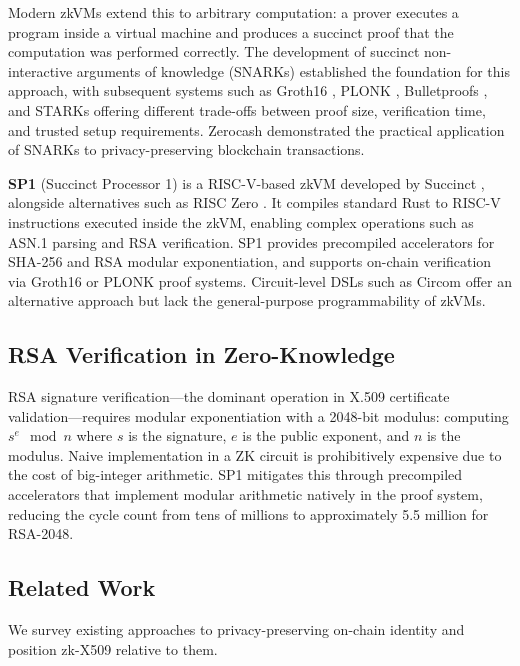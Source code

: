 \documentclass[11pt, a4paper]{article}
\begin{document}
Modern zkVMs extend this to arbitrary computation: a prover executes a
program inside a virtual machine and produces a succinct proof that the
computation was performed correctly. The development of succinct
non-interactive arguments of knowledge (SNARKs) \cite{ref14} established the
foundation for this approach, with subsequent systems such as Groth16
\cite{ref7}, PLONK \cite{ref16}, Bulletproofs \cite{ref31}, and STARKs \cite{ref17}
offering different trade-offs between proof size, verification time, and
trusted setup requirements. Zerocash \cite{ref32} demonstrated the practical
application of SNARKs to privacy-preserving blockchain transactions.

\textbf{SP1} (Succinct Processor 1) is a RISC-V-based zkVM developed by
Succinct \cite{ref6}, alongside alternatives such as RISC Zero \cite{ref29}. It
compiles standard Rust to RISC-V instructions executed inside the zkVM,
enabling complex operations such as ASN.1 parsing and RSA verification.
SP1 provides precompiled accelerators for SHA-256 and RSA modular
exponentiation, and supports on-chain verification via Groth16 \cite{ref7}
or PLONK \cite{ref16} proof systems. Circuit-level DSLs such as Circom
\cite{ref30} offer an alternative approach but lack the general-purpose
programmability of zkVMs.

\subsection{RSA Verification in
Zero-Knowledge}\label{rsa-verification-in-zero-knowledge}

RSA signature verification---the dominant operation in X.509 certificate
validation---requires modular exponentiation with a 2048-bit modulus:
computing \(s^e \mod n\) where \(s\) is the signature, \(e\) is the
public exponent, and \(n\) is the modulus. Naive implementation in a ZK
circuit is prohibitively expensive due to the cost of big-integer
arithmetic. SP1 mitigates this through precompiled accelerators that
implement modular arithmetic natively in the proof system, reducing the
cycle count from tens of millions to approximately 5.5 million for
RSA-2048.

\subsection{Related Work}\label{related-work}

We survey existing approaches to privacy-preserving on-chain identity
and position zk-X509 relative to them.
\end{document}
